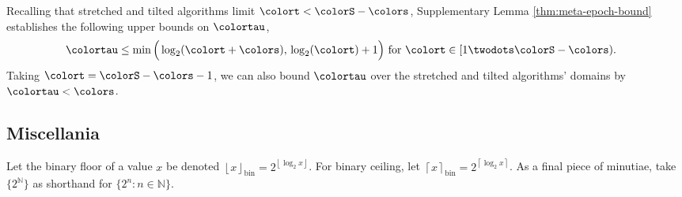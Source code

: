 Recalling that stretched and tilted algorithms limit $\colort < \colorS - \colors$, Supplementary Lemma \ref{thm:meta-epoch-bound} establishes the following upper bounds on $\colortau$,
\begin{align*}
\colortau
&\leq
\min\Big(
  \log_2(\colort + \colors),\,
  \log_2(\colort) + 1
\Big)
\text{ for } \colort \in [1 \twodots \colorS - \colors).
\end{align*}
Taking $\colort = \colorS - \colors - 1$, we can also bound $\colortau$ over the stretched and tilted algorithms' domains by $\colortau < \colors$.

\subsection{Miscellania}

Let the binary floor of a value $x$ be denoted $\left\lfloor x \right\rfloor_\mathrm{bin} = 2^{\left\lfloor \log_2 x \right\rfloor}$.
For binary ceiling, let $\left\lceil x \right\rceil_\mathrm{bin} = 2^{\left\lceil \log_2 x \right\rceil}$.
As a final piece of minutiae, take $\{2^{\mathbb{N}}\}$ as shorthand for $\{2^n : n \in \mathbb{N} \}$.
